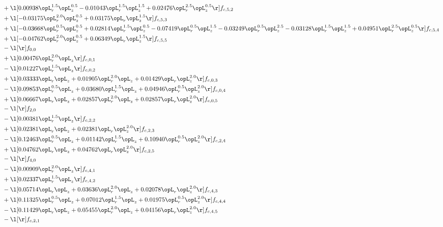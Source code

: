 \begin{alignat}{2}
& + \l[  0.00938 \opL_r^{1.5} \opL_z^{0.5}   -0.01043 \opL_r^{1.5} \opL_z^{1.5} +  0.02476 \opL_r^{2.5} \opL_z^{0.5}  \r] f_{c,5,2} \nonumber \\ 
& + \l[  -0.03175 \opL_r^{2.0} \opL_z^{0.5} +  0.03175 \opL_r \opL_z^{1.5}  \r] f_{c,5,3} \nonumber \\ 
& + \l[  -0.03668 \opL_r^{0.5} \opL_z^{0.5} +  0.02814 \opL_r^{1.5} \opL_z^{0.5}   -0.07419 \opL_r^{0.5} \opL_z^{1.5}   -0.03249 \opL_r^{0.5} \opL_z^{2.5}   -0.03128 \opL_r^{1.5} \opL_z^{1.5} +  0.04951 \opL_r^{2.5} \opL_z^{0.5}  \r] f_{c,5,4} \nonumber \\ 
& + \l[  -0.04762 \opL_r^{2.0} \opL_z^{0.5} +  0.06349 \opL_r \opL_z^{1.5}  \r] f_{c,5,5} \nonumber \\ 
& - \l[  \r] f_{0,0} \nonumber \\ 
& + \l[  0.00476 \opL_r^{2.0} \opL_z  \r] f_{c,0,1} \nonumber \\ 
& - \l[  0.01227 \opL_r^{1.5} \opL_z  \r] f_{c,0,2} \nonumber \\ 
& + \l[  0.03333 \opL_r \opL_z +  0.01905 \opL_r^{2.0} \opL_z +  0.01429 \opL_r \opL_z^{2.0}  \r] f_{c,0,3} \nonumber \\ 
& - \l[  0.09853 \opL_r^{0.5} \opL_z +  0.03680 \opL_r^{1.5} \opL_z +  0.04946 \opL_r^{0.5} \opL_z^{2.0}  \r] f_{c,0,4} \nonumber \\ 
& + \l[  0.06667 \opL_r \opL_z +  0.02857 \opL_r^{2.0} \opL_z +  0.02857 \opL_r \opL_z^{2.0}  \r] f_{c,0,5} \nonumber \\ 
& - \l[  \r] f_{2,0} \nonumber \\ 
& - \l[  0.00381 \opL_r^{1.5} \opL_z  \r] f_{c,2,2} \nonumber \\ 
& + \l[  0.02381 \opL_r \opL_z +  0.02381 \opL_r \opL_z^{2.0}  \r] f_{c,2,3} \nonumber \\ 
& - \l[  0.12463 \opL_r^{0.5} \opL_z +  0.01142 \opL_r^{1.5} \opL_z +  0.10940 \opL_r^{0.5} \opL_z^{2.0}  \r] f_{c,2,4} \nonumber \\ 
& + \l[  0.04762 \opL_r \opL_z +  0.04762 \opL_r \opL_z^{2.0}  \r] f_{c,2,5} \nonumber \\ 
& - \l[  \r] f_{4,0} \nonumber \\ 
& - \l[  0.00909 \opL_r^{2.0} \opL_z  \r] f_{c,4,1} \nonumber \\ 
& + \l[  0.02337 \opL_r^{1.5} \opL_z  \r] f_{c,4,2} \nonumber \\ 
& - \l[  0.05714 \opL_r \opL_z +  0.03636 \opL_r^{2.0} \opL_z +  0.02078 \opL_r \opL_z^{2.0}  \r] f_{c,4,3} \nonumber \\ 
& + \l[  0.11325 \opL_r^{0.5} \opL_z +  0.07012 \opL_r^{1.5} \opL_z +  0.01975 \opL_r^{0.5} \opL_z^{2.0}  \r] f_{c,4,4} \nonumber \\ 
& - \l[  0.11429 \opL_r \opL_z +  0.05455 \opL_r^{2.0} \opL_z +  0.04156 \opL_r \opL_z^{2.0}  \r] f_{c,4,5} \nonumber \\ 
& - \l[  \r] f_{c,2,1} \nonumber \\ 
\end{alignat} 



